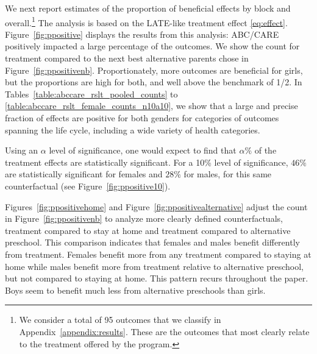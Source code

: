 We next report estimates of the proportion of beneficial effects by block and overall.\footnote{We consider a total of 95 outcomes that we classify in Appendix~\ref{appendix:results}. These are the outcomes that most clearly relate to the treatment offered by the program.} The analysis is based on the LATE-like treatment effect \eqref{eq:effect}. Figure~\ref{fig:ppositive} displays the results from this analysis: ABC/CARE positively impacted a large percentage of the outcomes. We show the count for treatment compared to the next best alternative parents chose in Figure~\ref{fig:ppositivenb}. Proportionately, more outcomes are beneficial for girls, but the proportions are high for both, and well above the benchmark of 1/2. In Tables~\ref{table:abccare_rslt_pooled_counts} to \ref{table:abccare_rslt_female_counts_n10a10}, we show that a large and precise fraction of effects are positive for both genders for categories of outcomes spanning the life cycle, including a wide variety of health categories.

Using an $\alpha$ level of significance, one would expect to find that $\alpha\%$ of the treatment effects are statistically significant. For a 10\% level of significance, $46\%$ are statistically significant for females and $28\%$ for males, for this same counterfactual (see Figure~\ref{fig:ppositive10}).

Figures~\ref{fig:ppositivehome} and Figure~\ref{fig:ppositivealternative} adjust the count in Figure~\ref{fig:ppositivenb} to analyze more clearly defined counterfactuals, treatment compared to stay at home and treatment compared to alternative preschool. This comparison indicates that females and males benefit differently from treatment. Females benefit more from any treatment compared to staying at home while males benefit more from treatment relative to alternative preschool, but not compared to staying at home. This pattern recurs throughout the paper. Boys seem to benefit much less from alternative preschools than girls.


